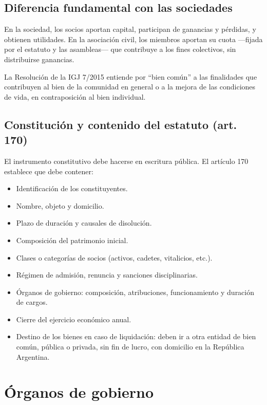 \documentclass[12pt,oneside]{book}
\begin{document}
\subsection{Diferencia fundamental con las sociedades}

En la sociedad, los socios aportan capital, participan de ganancias y pérdidas, y obtienen utilidades. En la asociación civil, los miembros aportan su cuota —fijada por el estatuto y las asambleas— que contribuye a los fines colectivos, sin distribuirse ganancias.

\begin{note}
La Resolución de la IGJ 7/2015 entiende por ``bien común'' a las finalidades que contribuyen al bien de la comunidad en general o a la mejora de las condiciones de vida, en contraposición al bien individual.
\end{note}

\subsection{Constitución y contenido del estatuto (art. 170)}

El instrumento constitutivo debe hacerse en escritura pública. El artículo 170 establece que debe contener:

\begin{itemize}
    \item Identificación de los constituyentes.
    \item Nombre, objeto y domicilio.
    \item Plazo de duración y causales de disolución.
    \item Composición del patrimonio inicial.
    \item Clases o categorías de socios (activos, cadetes, vitalicios, etc.).
    \item Régimen de admisión, renuncia y sanciones disciplinarias.
    \item Órganos de gobierno: composición, atribuciones, funcionamiento y duración de cargos.
    \item Cierre del ejercicio económico anual.
    \item Destino de los bienes en caso de liquidación: deben ir a otra entidad de bien común, pública o privada, sin fin de lucro, con domicilio en la República Argentina.
\end{itemize}

\section{Órganos de gobierno}
\end{document}
